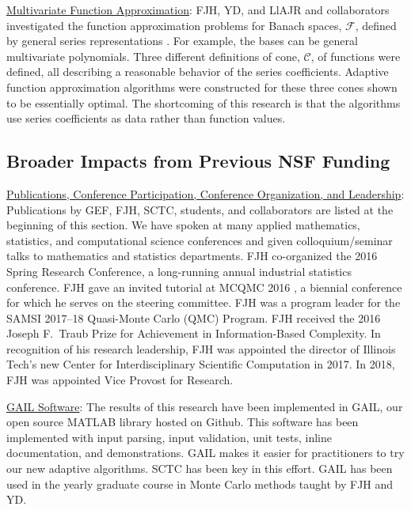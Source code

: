 \documentclass[11pt]{NSFamsart}
\newcommand{\Upara}[1]{\noindent\underline{\upshape #1}:}
\newcommand{\GAIL}{GAIL\xspace}
\newcommand{\MATLAB}{MATLAB\xspace}
\newcommand{\Rlang}{R\xspace}
\newcommand{\calc}{{\mathcal{C}}}
\newcommand{\calf}{{\mathcal{F}}}
\begin{document}
\Upara{Multivariate Function Approximation} \label{sec:PrevFunAppx}
FJH, YD, and LlAJR and collaborators investigated the function approximation problems for Banach spaces, $\calf$, defined by general series representations \cite{DinHic20a,DinEtal20a}.  For example, the bases can be general multivariate polynomials.  Three different definitions of cone, $\calc$, of functions were defined, all describing a reasonable behavior of the series coefficients.  Adaptive function approximation algorithms were constructed for these three cones shown to be essentially optimal.  The shortcoming of this research is that the algorithms use series coefficients as data rather than function values. 


\subsection{Broader Impacts from Previous NSF Funding} \label{prevBIsect}
\phantom{a}

\Upara{Publications, Conference Participation, Conference Organization, and Leadership} Publications by GEF, FJH,  SCTC, students, and collaborators are listed at the beginning of this section.  We have spoken at many applied mathematics, statistics, 
and computational science conferences and given colloquium/seminar talks to mathematics and 
statistics departments.  FJH co-organized the 
2016 Spring Research 
Conference, a long-running annual industrial statistics conference.   FJH gave an invited tutorial
at MCQMC 2016
\cite{Hic17a}, a biennial conference for which he serves on the steering committee.  FJH 
was a program leader for the SAMSI 2017--18 Quasi-Monte Carlo (QMC) Program.   FJH received the 2016 Joseph F.\ Traub Prize for Achievement in Information-Based Complexity. In recognition of his research leadership, FJH was appointed the director of Illinois Tech's new Center for Interdisciplinary 
Scientific Computation in 2017.  In 2018, FJH was appointed Vice Provost for Research.
	
\Upara{\GAIL Software} The results of this research have been implemented in 
\GAIL, our open source \MATLAB library hosted on
Github. This software 
has been implemented with input parsing, input validation, unit tests, inline documentation, and 
demonstrations.  \GAIL makes it easier for practitioners to try our new adaptive algorithms.  SCTC has been key in this effort.  \GAIL has been used in the yearly graduate course in Monte Carlo methods taught by FJH and YD.  
\end{document}
